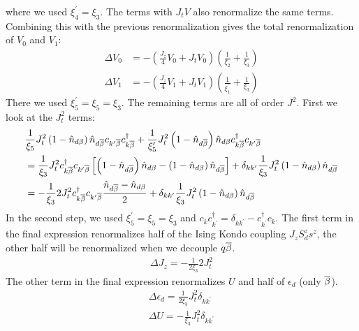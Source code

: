 \documentclass[12pt,twoside]{report}
\numberwithin{equation}{section}
\begin{document}
where we used \(\xi_4^\prime = \xi_3\). The terms with \(J_t V\) also renormalize the same terms. Combining this with the previous renormalization gives the total renormalization of \(V_0\) and \(V_1\):
\begin{equation}\begin{aligned}
	\label{V}
	\Delta V_0 &= -\left(\frac{J_z}{4}V_0 + J_t V_0\right) \left(\frac{1}{\xi_2} + \frac{1}{\xi_3}\right)\\
	\Delta V_1 &= -\left(\frac{J_z}{4}V_1 + J_t V_1\right) \left(\frac{1}{\xi^\prime_1} + \frac{1}{\xi_3}\right)
\end{aligned}\end{equation}
There we used \(\xi_5^\prime = \xi_5 = \xi_3\).
\pb The remaining terms are all of order \(J^2\). First we look at the \(J_t^2\) terms:
\begin{equation}\begin{aligned}
&\frac{1}{\xi_5}J_t^2 \left( 1 - \hat n_{d\beta} \right) \hat n_{d\overline\beta} c_{k^\prime\overline\beta}c^\dagger_{k\overline\beta} + \frac{1}{\xi^\prime_5}J_t^2 \left( 1 - \hat n_{d\overline\beta} \right) \hat n_{d\beta} c^\dagger_{k\overline\beta} c_{k^\prime\overline\beta}\\
&=\frac{1}{\xi_3}J_t^2 c^\dagger_{k\overline\beta} c_{k^\prime\overline\beta}\left[\left( 1 - \hat n_{d\overline\beta} \right) \hat n_{d\beta} - \left( 1 - \hat n_{d\beta} \right) \hat n_{d\overline\beta}\right]  + \delta_{kk^\prime} \frac{1}{\xi_3}J_t^2\left( 1 - \hat n_{d\beta} \right) \hat n_{d\overline\beta}\\
&=-\frac{1}{\xi_3}2J_t^2 c^\dagger_{k\overline\beta} c_{k^\prime\overline\beta}\frac{\hat n_{d\overline\beta} - \hat n_{d\beta}}{2}  + \delta_{kk^\prime} \frac{1}{\xi_3}J_t^2\left( 1 - \hat n_{d\beta} \right) \hat n_{d\overline\beta}
\end{aligned}\end{equation}
In the second step, we used \(\xi_5^\prime = \xi_5 = \xi_3\) and \(c_k c^\dagger_{k^\prime} = \delta_{kk^\prime} - c^\dagger_{k^\prime}c_k\). The first term in the final expression renormalizes half of the Ising Kondo coupling \(J_z S^z_d s^z\), the other half will be renormalized when we decouple \(q\overline\beta\).
\begin{equation}\begin{aligned}
	\label{Jz}
	\Delta J_z = -\frac{1}{2\xi_3}2J_t^2
\end{aligned}\end{equation}
The other term in the final expression renormalizes \(U\) and half of \(\epsilon_d\) (only \(\overline\beta\)).
\begin{equation}\begin{aligned}
	\label{edU3}
	\Delta \epsilon_d = \frac{1}{2\xi_3}J_t^2 \delta_{kk^\prime}\\
	\Delta U = -\frac{1}{\xi_3}J_t^2\delta_{kk^\prime}\\
\end{aligned}\end{equation}
\end{document}
